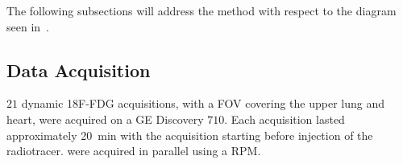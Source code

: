             The following subsections will address the method with respect to the diagram seen in~.
            
            \subsection{Data Acquisition} \label{sec:pca_data_driven_surrogate_signal_extraction_methods_for_dynamic_pet_methods_data_acquisition}
                $21$ dynamic \gls{18F-FDG} acquisitions, with a \gls{FOV} covering the upper lung and heart, were acquired on a \gls{GE} Discovery $710$. Each acquisition lasted approximately \SI{20}{\minute} with the acquisition starting before injection of the radiotracer.  were acquired in parallel using a \gls{RPM}.
                
